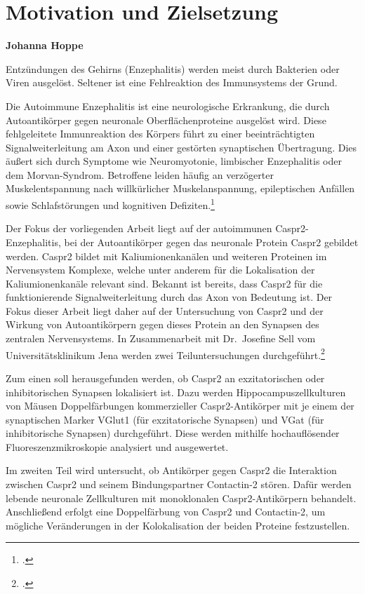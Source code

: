 \documentclass[a4paper, 12pt]{scrreprt}
\begin{document}
\hypersetup{pageanchor=false}


\tableofcontents


\chapter{Motivation und Zielsetzung}
\textbf{Johanna Hoppe}


Entzündungen des Gehirns (Enzephalitis) werden meist durch Bakterien
oder Viren ausgelöst. Seltener ist eine Fehlreaktion des Immunsystems
der Grund.

Die Autoimmune Enzephalitis ist eine neurologische Erkrankung, die durch
Autoantikörper gegen neuronale Oberflächenproteine ausgelöst wird. Diese
fehlgeleitete Immunreaktion des Körpers führt zu einer beeinträchtigten
Signalweiterleitung am Axon und einer gestörten synaptischen
Übertragung. Dies äußert sich durch Symptome wie Neuromyotonie,
limbischer Enzephalitis oder dem Morvan-Syndrom. Betroffene leiden häufig
an verzögerter Muskelentspannung nach willkürlicher Muskelanspannung,
epileptischen Anfällen sowie Schlafstörungen und kognitiven
Defiziten.\footcite{VanSonderenNatRev2016}

Der Fokus der vorliegenden Arbeit liegt auf der autoimmunen
Caspr2-Enzephalitis, bei der Autoantikörper gegen das neuronale Protein
Caspr2 gebildet werden. Caspr2 bildet mit Kaliumionenkanälen und
weiteren Proteinen im Nervensystem Komplexe, welche unter anderem für
die Lokalisation der Kaliumionenkanäle relevant sind. Bekannt ist
bereits, dass Caspr2 für die funktionierende Signalweiterleitung durch
das Axon von Bedeutung ist. Der Fokus dieser Arbeit liegt daher auf der
Untersuchung von Caspr2 und der Wirkung von Autoantikörpern gegen
dieses Protein an den Synapsen des zentralen Nervensystems. In
Zusammenarbeit mit Dr.~Josefine Sell vom Universitätsklinikum Jena
werden zwei Teiluntersuchungen
durchgeführt.\footcite{Mitrevski}

Zum einen soll herausgefunden werden, ob Caspr2 an exzitatorischen oder
inhibitorischen Synapsen lokalisiert ist. Dazu werden
Hippocampuszellkulturen von Mäusen Doppelfärbungen kommerzieller
Caspr2-Antikörper mit je einem der synaptischen Marker VGlut1 (für
exzitatorische Synapsen) und VGat (für inhibitorische Synapsen)
durchgeführt. Diese werden mithilfe hochauflösender
Fluoreszenzmikroskopie analysiert und ausgewertet.

Im zweiten Teil wird untersucht, ob Antikörper gegen Caspr2 die
Interaktion zwischen Caspr2 und seinem Bindungspartner Contactin-2
stören. Dafür werden lebende neuronale Zellkulturen mit monoklonalen
Caspr2-Antikörpern behandelt. Anschließend erfolgt eine Doppelfärbung
von Caspr2 und Contactin-2, um mögliche Veränderungen in der
Kolokalisation der beiden Proteine festzustellen.
\end{document}
